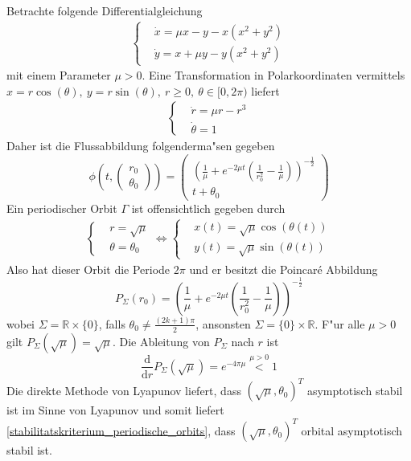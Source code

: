 \documentclass[a4paper, 13pt]{scrreprt}
\theoremstyle{definition} \newtheorem{definition}{Definition}[section]
\newenvironment{beispiel}[1][Beispiel]{\begin{trivlist}
\item[\hskip \labelsep {\bfseries #1}]}{\end{trivlist}}
\newcommand{\RR}{\mathbb{R}}
\begin{document}
\begin{beispiel}
Betrachte folgende Differentialgleichung
\begin{align*}
	\begin{cases}
		&\dot x = \mu x - y - x(x^2+y^2)\\
		&\dot y = x + \mu y - y(x^2+y^2)
	\end{cases}
\end{align*}
mit einem Parameter $\mu > 0$. Eine Transformation in Polarkoordinaten vermittels $x = r \cos(\theta),\ y = r \sin(\theta), \ r\geq 0, \ \theta \in [0,2\pi)$ liefert
\begin{align*}
	\begin{cases}
		&\dot r = \mu r - r ^3\\
		& \dot \theta = 1
	\end{cases}
\end{align*}
Daher ist die Flussabbildung folgenderma"sen gegeben
$$\phi\left(t, \begin{pmatrix} r_0\\ \theta_0 \end{pmatrix}\right) = \begin{pmatrix}
	\left(\frac 1\mu + e^{-2\mu t}\left(\frac{1}{r_0^2} - \frac 1\mu\right)\right)^{-\frac 12}\\
	t + \theta_0
\end{pmatrix}$$
Ein periodischer Orbit $\Gamma$ ist offensichtlich gegeben durch 
\begin{align*}
\begin{cases}
 &r = \sqrt\mu\\
 &\theta = \theta_0
\end{cases}
\Leftrightarrow
\begin{cases}
 & x(t) = \sqrt\mu \cos\left(\theta(t)\right)\\
 & y(t) = \sqrt\mu \sin\left(\theta(t)\right)
\end{cases}
\end{align*}
Also hat dieser Orbit die Periode $2\pi$ und er besitzt die Poincar\'{e} Abbildung
$$ P_\Sigma (r_0) = \left(\frac 1\mu + e^{-2\mu t}\left(\frac{1}{r_0^2} - \frac 1\mu\right)\right)^{-\frac 12}$$
wobei $\Sigma = \RR\times\{0\}$, falls $\theta_0 \neq \frac{(2k+1)\pi}{2}$, ansonsten $\Sigma = \{0\}\times\RR$. F"ur alle $\mu > 0$ gilt $P_\Sigma(\sqrt \mu) = \sqrt \mu$. Die Ableitung von $P_\Sigma$ nach $r$ ist 
$$\frac{\mathrm d}{\mathrm dr} P_\Sigma(\sqrt \mu) = e^{-4 \pi \mu} \stackrel{\mu > 0} < 1$$
Die direkte Methode von Lyapunov liefert, dass $(\sqrt \mu, \theta_0)^T$ asymptotisch stabil ist im Sinne von Lyapunov und somit liefert \eqref{stabilitatskriterium_periodische_orbits}, dass $(\sqrt \mu, \theta_0)^T$ orbital asymptotisch stabil ist.
\end{beispiel}
\end{document}

